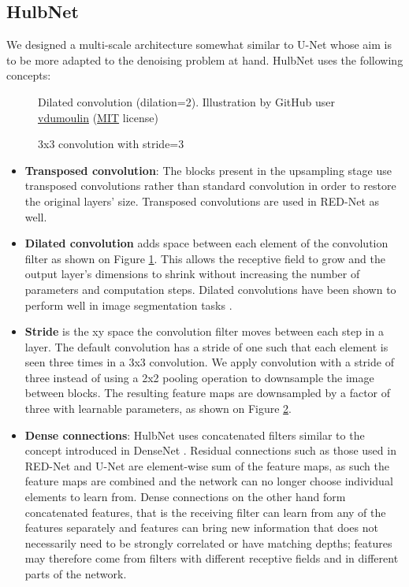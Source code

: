 \subsection{HulbNet}\label{sec:HulbNet}
We designed a multi-scale architecture somewhat similar to U-Net whose aim is to be more adapted to the denoising problem at hand. HulbNet uses the following concepts:
\begin{figure}
  \begin{center}
    \caption[Dilated convolution]{Dilated convolution (dilation=2). Illustration by GitHub user \href{https://github.com/vdumoulin/conv\_arithmetic}{vdumoulin} (\href{https://github.com/vdumoulin/conv\_arithmetic/blob/master/LICENSE}{MIT} license)}
    \label{fig:dilated}
  \end{center}
\end{figure}
\begin{figure}
  \begin{center}
      
    \caption[Strided convolution]{3x3 convolution with stride=3}
    \label{fig:str3}
  \end{center}
\end{figure}
\begin{itemize}
  \item \textbf{Transposed convolution}: The blocks present in the upsampling stage use transposed convolutions rather than standard convolution in order to restore the original layers' size. Transposed convolutions are used in RED-Net as well.
  \item \textbf{Dilated convolution} adds space between each element of the convolution filter as shown on Figure \ref{fig:dilated}. This allows the receptive field to grow and the output layer's dimensions to shrink without increasing the number of parameters and computation steps. Dilated convolutions have been shown to perform well in image segmentation tasks \cite{multi-scale-dilation}.
  \item \textbf{Stride} is the xy space the convolution filter moves between each step in a layer. The default convolution has a stride of one such that each element is seen three times in a 3x3 convolution. We apply convolution with a stride of three instead of using a 2x2 pooling operation to downsample the image between blocks. The resulting feature maps are downsampled by a factor of three with learnable parameters, as shown on Figure \ref{fig:str3}.
  \item \textbf{Dense connections}: HulbNet uses concatenated filters similar to the concept introduced in DenseNet \cite{densenet}. Residual connections such as those used in \ac{RED-Net} \cite{rednet} and U-Net \cite{unet} are element-wise sum of the feature maps, as such the feature maps are combined and the network can no longer choose individual elements to learn from. Dense connections on the other hand form concatenated features, that is the receiving filter can learn from any of the features separately and features can bring new information that does not necessarily need to be strongly correlated or have matching depths; features may therefore come from filters with different receptive fields and in different parts of the network.
\end{itemize}
